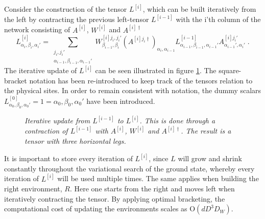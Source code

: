 Consider the construction of the tensor $L^{[i]}$, which can be built iteratively from the left by contracting the previous left-tensor $L^{[i-1]}$ with the i'th column of the network consisting of $A^{[i]}$, $W^{[i]}$ and $A^{[i] \dag}$
\begin{equation}
	L_{\alpha_i , \beta_i , \alpha_i '}^{[i]} = \sum_{\substack{ j_i , j_i ' \\ \alpha_{i-1} , \beta_{i-1} , \alpha_{i-1} '}} W_{\beta_{i-1} , \beta_i}^{[i] j_i , j_i '} \left( A^{[i] j_i \dag} \right)_{\alpha_i , \alpha_{i-1}} L_{\alpha_{i-1} , \beta_{i-1} , \alpha_{i-1} '}^{[i-1]} A_{\alpha_{i-1} ' , \alpha_i '}^{[i] j_i '} \; .
\end{equation}
The iterative update of $L^{[i]}$ can be seen illustrated in figure \ref{fig:buildLTensor}. The square-bracket notation has been re-introduced to keep track of the tensors relation to the physical sites. In order to remain consistent with notation, the dummy scalars $L_{\alpha_0 , \beta_0 , \alpha_0 '}^{[0]}  = 1  = \alpha_0 , \beta_0 , \alpha_0 '$ have been introduced.\\
\begin{figure}[h!]
	\centering
	
	\caption{\textit{Iterative update from $L^{[i-1]}$ to $L^{[i]}$. This is done through a contraction of $L^{[i-1]}$ with $A^{[i]}$, $W^{[i]}$ and $A^{[i] \dag}$. The result is a tensor with three horizontal legs.}}
	\label{fig:buildLTensor}
\end{figure}
It is important to store every iteration of $L^{[i]}$, since $L$ will grow and shrink constantly throughout the variational search of the ground state, whereby every iteration of $L^{[i]}$ will be used multiple times.
The same applies when building the right environment, $R$. Here one starts from the right and moves left when iteratively contracting the tensor. By applying optimal bracketing, the computational cost of updating the environments scales as $\mathrm{O}(d D^3 D_W)$.
  

